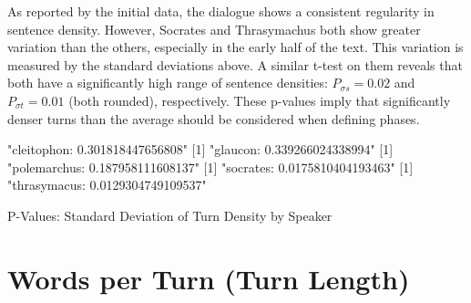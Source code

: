 \documentclass[noraggedright]{turabian-researchpaper}
\begin{document}
As reported by the initial data, the dialogue shows a consistent regularity in
sentence density. However, Socrates and Thrasymachus both show greater variation
than the others, especially in the early half of the text. 
This variation is measured by the standard deviations above. A similar t-test on
them reveals that both have a significantly high range of sentence densities:
$P_{\sigma s} = 0.02$ and $P_{\sigma t} = 0.01$ (both rounded), respectively. These
p-values imply that significantly denser turns than the average should be
considered when defining phases.

\begin{table}
\begin{Schunk}
\begin{Soutput}
[1] "cleitophon: 0.301818447656808"
[1] "glaucon: 0.339266024338994"
[1] "polemarchus: 0.187958111608137"
[1] "socrates: 0.0175810404193463"
[1] "thrasymacus: 0.0129304749109537"
\end{Soutput}
\end{Schunk}
\caption{P-Values: Standard Deviation of Turn Density by Speaker}
\label{tab:SDPval}
\end{table}

\section{Words per Turn (Turn Length)}
\end{document}

